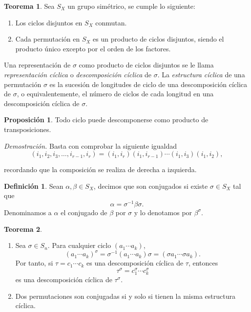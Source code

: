\documentclass[12pt]{article}
\theoremstyle{definition}
\newtheorem{defi}{Definición}[section]
\newtheorem{teor}{Teorema}[section]
\newtheorem{prop}{Proposición}[section]
\begin{document}
\begin{teor}
Sea $S_X$ un grupo simétrico, se cumple lo siguiente:
\begin{enumerate}
\item Los ciclos disjuntos en $S_X$ conmutan.
\item Cada permutación en $S_X$ es un producto de ciclos disjuntos, siendo el producto único excepto por el orden de los factores. 
\end{enumerate}
\label{teor:trans}
\end{teor}
Una representación de $\sigma$ como producto de ciclos disjuntos se le llama \textit{representación cíclica} o \textit{descomposición cíclica} de $\sigma$. La \textit{estructura cíclica} de una permutación $\sigma$ es la sucesión de longitudes de ciclo de una descomposición cíclica de $\sigma$, o equivalentemente, el número de ciclos de cada longitud en una descomposición cíclica de $\sigma$. 
\begin{prop}
Todo ciclo puede descomponerse como producto de transposiciones.
\label{prop:trans}
\end{prop}
\textit{Demostración.} Basta con comprobar la siguiente igualdad
$$(i_1,i_2,i_3,\ldots,i_{r-1},i_r) = (i_1,i_r)(i_1,i_{r-1})\cdots(i_1,i_3)(i_1,i_2),$$

recordando que la composición se realiza de derecha a izquierda.

\begin{defi}
Sean $\alpha,\beta\in S_X$, decimos que son conjugados si existe $\sigma\in S_X$ tal que $$\alpha = \sigma^{-1}\beta\sigma.$$
Denominamos a $\alpha$ el conjugado de $\beta$ por $\sigma$ y lo denotamos por $\beta^\sigma$.
\end{defi}


\begin{teor}
\ 

\begin{enumerate}
\item Sea $\sigma\in S_n$. Para cualquier ciclo $(a_1\cdots a_k)$,
$$(a_1 \cdots a_k)^\sigma= \sigma^{-1}(a_1 \cdots a_k)\sigma = (\sigma a_1 \cdots \sigma a_k).$$
Por tanto, si $\tau=c_1\cdots c_k$ es una descomposición cíclica de $\tau$, entonces
$$\tau^\sigma = c_1^\sigma\cdots c_k^\sigma$$
es una descomposición cíclica de $\tau^\sigma$.
\item Dos permutaciones son conjugadas si y solo si tienen la misma estructura cíclica.
\end{enumerate}
\end{teor}
\end{document}
